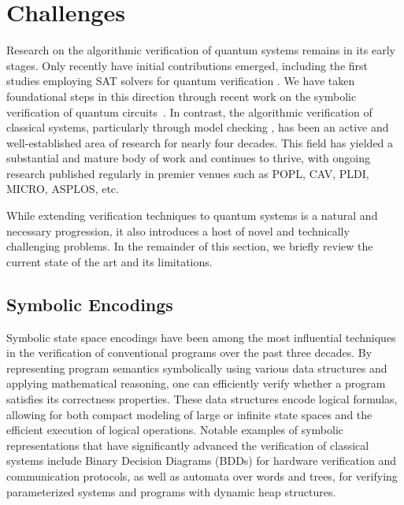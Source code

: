 \section{Challenges}
\label{challenges:section}

Research on the algorithmic verification of quantum systems remains in its early stages.
%
Only recently have initial contributions emerged, including the first studies employing SAT solvers for quantum verification \citep{DBLP:conf/cade/ChenRT23}.
%
We have taken foundational steps in this direction through recent work on the symbolic verification of quantum circuits~\citep{PLanQC25,DBLP:journals/pacmpl/AbdullaCCHLLLT25,CACM25,ChenCLLTY23,ChenCLLT23,chen2025autoq}.
%
In contrast, the algorithmic verification of classical systems, particularly through model checking \citep{DBLP:reference/mc/AbdullaST18}, has been an active and well-established area of research for nearly four decades.
%
This field has yielded a substantial and mature body of work and continues to thrive, with ongoing research published regularly in premier venues such as {\sc POPL}, {\sc CAV}, {\sc PLDI}, {\sc MICRO}, {\sc ASPLOS}, etc.
%

While extending verification techniques to quantum systems is a natural and necessary progression, it also introduces a host of novel and technically challenging problems.
%
In the remainder of this section, we briefly review the current state of the art and its limitations.
%

\subsection{Symbolic Encodings}

Symbolic state space encodings have been among the most influential techniques in the verification of conventional programs over the past three decades.
%
By representing program semantics symbolically using various data structures and applying mathematical reasoning, one can efficiently verify whether a program satisfies its correctness properties.
%
These data structures encode logical formulas, allowing for both compact modeling of large or infinite state spaces and the efficient execution of logical operations.
%
Notable examples of symbolic representations that have significantly advanced the verification of classical systems include Binary Decision Diagrams (BDDs) for hardware verification and communication protocols, as well as automata over words and trees, for verifying parameterized systems and programs with dynamic heap structures.
%

